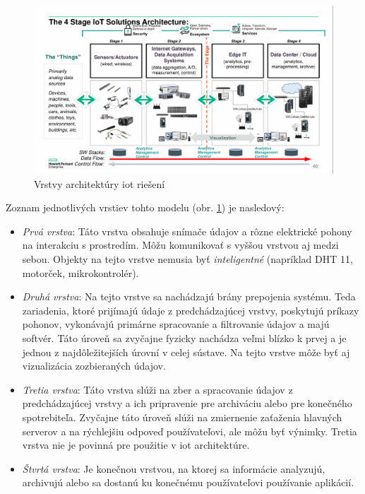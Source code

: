 \begin{figure}[!ht]
    \centering
    \includegraphics[width=.9\textwidth]{figures/iot}
    \caption{Vrstvy architektúry \gls{iot} riešení \label{iot} \cite{iotTukeLekcia1}}
\end{figure}

Zoznam jednotlivých vrstiev tohto modelu (obr. \ref{iot}) je nasledový:

\begin{itemize}
    \item \textit{Prvá vrstva}: Táto vrstva obsahuje snímače údajov a rôzne elektrické pohony na interakciu s prostredím. Môžu komunikovať s vyššou vrstvou aj medzi sebou. Objekty na tejto vrstve nemusia byť \textit{inteligentné} (napríklad DHT 11, motorček, mikrokontrolér).
    \item \textit{Druhá vrstva}: Na tejto vrstve sa nachádzajú brány prepojenia systému. Teda zariadenia, ktoré prijímajú údaje z predchádzajúcej vrstvy, poskytujú príkazy pohonov, vykonávajú primárne spracovanie a filtrovanie údajov a majú softvér. Táto úroveň sa zvyčajne fyzicky nachádza veľmi blízko k prvej a je jednou z najdôležitejších úrovní v celej sústave. Na tejto vrstve môže byť aj vizualizácia zozbieraných údajov.
    \item \textit{Tretia vrstva}: Táto vrstva slúži na zber a spracovanie údajov z predchádzajúcej vrstvy a ich pripravenie pre archiváciu alebo pre konečného spotrebiteľa. Zvyčajne táto úroveň slúži na zmiernenie zaťaženia hlavných serverov a na rýchlejšiu odpoveď používateľovi, ale môžu byť výnimky. Tretia vrstva nie je povinná pre použitie v \gls{iot} architektúre.
    \item \textit{Štvrtá vrstva}: Je konečnou vrstvou, na ktorej sa informácie analyzujú, archivujú alebo sa dostanú ku konečnému používateľovi používanie aplikácií.
\end{itemize}

